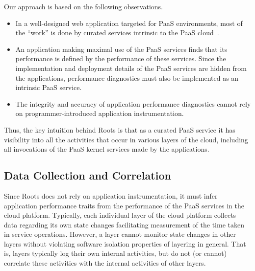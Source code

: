 Our approach is based on the following observations.
\begin{itemize}
\item In a well-designed web application targeted for PaaS environments, 
most of the ``work'' is done by
curated services intrinsic to the PaaS cloud~\cite{Jayathilaka:2015:RTS:2806777.2806842}.
\item An application making maximal use of the PaaS services finds that its
performance is defined by the performance of these services.  Since the 
implementation and deployment details of the PaaS services are hidden
from the applications,
performance diagnostics must also be implemented as an intrinsic PaaS service.
\item The integrity and accuracy of application performance diagnostics
cannot rely on programmer-introduced application instrumentation.
\end{itemize}
Thus, the key intuition behind Roots is that as a curated PaaS service
it has visibility into all the activities that occur in various layers of the cloud,
including all invocations of the PaaS kernel services made by the applications.

%

\subsection{Data Collection and Correlation}

Since Roots does not rely on application instrumentation,
it must infer application performance traits from 
the performance of the PaaS services in the cloud platform. 
Typically, each individual layer of the cloud platform collects data regarding
its own state changes facilitating measurement of the time taken in service
operations. However, a layer cannot monitor state changes
in other layers without violating software isolation properties of
layering in general.   That is, layers typically log their own internal
activities, but do not (or cannot) correlate these activities
with the internal activities of other layers.
 
